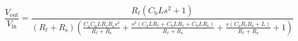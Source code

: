 \begin{equation}
\frac{V_{\mathrm{out}}}{V_{\mathrm{in}}} = \frac{R_{\ell} \left(C_{\mathrm{b}} L s^{2} + 1\right)}{\left(R_{\ell} + R_{\mathrm{s}}\right) \left(\frac{C_{\mathrm{a}} C_{\mathrm{b}} L R_{\ell} R_{\mathrm{s}} s^{3}}{R_{\ell} + R_{\mathrm{s}}} + \frac{s^{2} \left(C_{\mathrm{a}} L R_{\ell} + C_{\mathrm{b}} L R_{\ell} + C_{\mathrm{b}} L R_{\mathrm{s}}\right)}{R_{\ell} + R_{\mathrm{s}}} + \frac{s \left(C_{\mathrm{a}} R_{\ell} R_{\mathrm{s}} + L\right)}{R_{\ell} + R_{\mathrm{s}}} + 1\right)}
\label{eq-H1}
\end{equation}

